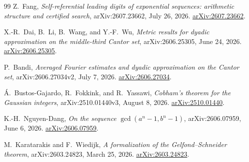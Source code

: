 \documentclass[11pt,oneside]{article}
\theoremstyle{definition}
\theoremstyle{remark}
\begin{document}
\begin{thebibliography}{99}
Z.~Fang,
\newblock \emph{Self-referential leading digits of exponential sequences: arithmetic structure and certified search},
\newblock arXiv:2607.23662, July 26, 2026.
\newblock \href{https://arxiv.org/abs/2607.23662}{arXiv:2607.23662}.

X.-R.~Dai, B.~Li, B.~Wang, and Y.-F.~Wu,
\newblock \emph{Metric results for dyadic approximation on the middle-third Cantor set},
\newblock arXiv:2606.25305, June 24, 2026.
\newblock \href{https://arxiv.org/abs/2606.25305}{arXiv:2606.25305}.

P.~Bandi,
\newblock \emph{Averaged Fourier estimates and dyadic approximation on the Cantor set},
\newblock arXiv:2606.27034v2, July 7, 2026.
\newblock \href{https://arxiv.org/abs/2606.27034}{arXiv:2606.27034}.

\'A.~Bustos-Gajardo, R.~Fokkink, and R.~Yassawi,
\newblock \emph{Cobham's theorem for the Gaussian integers},
\newblock arXiv:2510.01440v3, August 8, 2026.
\newblock \href{https://arxiv.org/abs/2510.01440}{arXiv:2510.01440}.

K.-H.~Nguyen-Dang,
\newblock \emph{On the sequence $\gcd(a^n-1,b^n-1)$},
\newblock arXiv:2606.07959, June 6, 2026.
\newblock \href{https://arxiv.org/abs/2606.07959}{arXiv:2606.07959}.

M.~Karatarakis and F.~Wiedijk,
\newblock \emph{A formalization of the Gelfond--Schneider theorem},
\newblock arXiv:2603.24823, March 25, 2026.
\newblock \href{https://arxiv.org/abs/2603.24823}{arXiv:2603.24823}.

\end{thebibliography}
\end{document}
